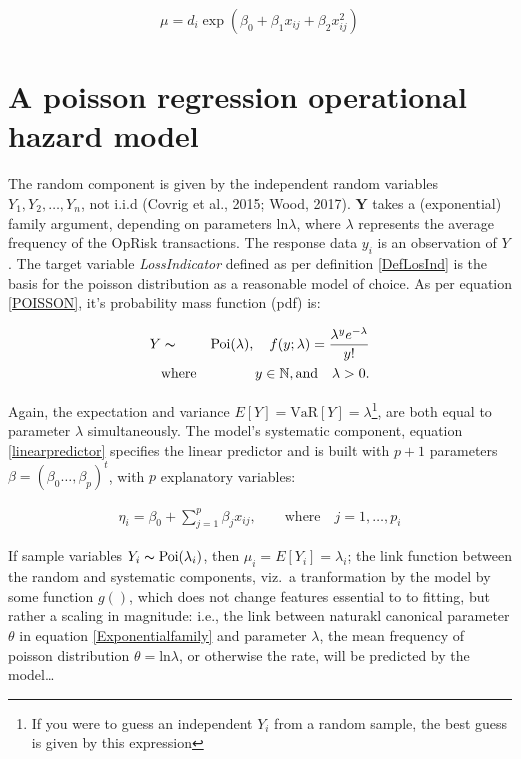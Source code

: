 \documentclass{DissertateUSU}
\begin{document}
\singlespacing

\begin{eqnarray}\label{eqn:adaptedpoisson}
\mu = d_i\exp{(\beta_0 + \beta_1x_{ij} + \beta_2x_{ij}^2)} 
\end{eqnarray} \doublespacing

\section{A poisson regression operational hazard model}
\label{sec:A poisson regression operational hazard model}

The random component is given by the independent random variables
\(Y_1, Y_2,\ldots, Y_n\), not i.i.d (Covrig et al., 2015; Wood, 2017).
\(\mathbf{Y}\) takes a (exponential) family argument, depending on
parameters \(\mbox{ln}\lambda\), where \(\lambda\) represents the
average frequency of the OpRisk transactions. The response data \(y_i\)
is an observation of \(Y\). The target variable \emph{LossIndicator}
defined as per definition \ref{DefLosInd} is the basis for the poisson
distribution as a reasonable model of choice. As per equation
\ref{POISSON}, it's probability mass function (pdf) is:

\singlespacing

\begin{eqnarray}\label{eqn:Poisson}
Y &\thicksim & \mbox{Poi}(\lambda), \quad f(y;\lambda) = \frac{\lambda^y e^{-\lambda}}{y!}\\
 &\mbox{where}& \quad y \in  \mathbb{N}, \mbox{and} \quad \lambda > 0. \nonumber
\end{eqnarray} \doublespacing

Again, the expectation and variance
\(E[Y] = \mbox{VaR}[Y] = \lambda\)\footnote{If you were to guess an independent $Y_i$ from a random sample, the best guess is given by this expression},
are both equal to parameter \(\lambda\) simultaneously. The model's
systematic component, equation \ref{linearpredictor} specifies the
linear predictor and is built with \(p + 1\) parameters
\(\beta = (\beta_0\ldots,\beta_p)^t\), with \(p\) explanatory variables:

\singlespacing

\begin{eqnarray}
\eta_i = \beta_0 + \sum_{j=1}^{p}\beta_jx_{ij}, \qquad \mbox{where} \quad j = 1,\ldots,p_i
\end{eqnarray} \doublespacing

If sample variables \(Y_i \thicksim \mbox{Poi}(\lambda_i)\), then
\(\mu_i = E[Y_i] = \lambda_i\); the link function between the random and
systematic components, viz.~a tranformation by the model by some
function \(g()\), which does not change features essential to to
fitting, but rather a scaling in magnitude: i.e., the link between
naturakl canonical parameter \(\theta\) in equation
\ref{Exponentialfamily} and parameter \(\lambda\), the mean frequency of
poisson distribution \(\theta = \mbox{ln}\lambda\), or otherwise the
rate, will be predicted by the model\ldots
\end{document}
